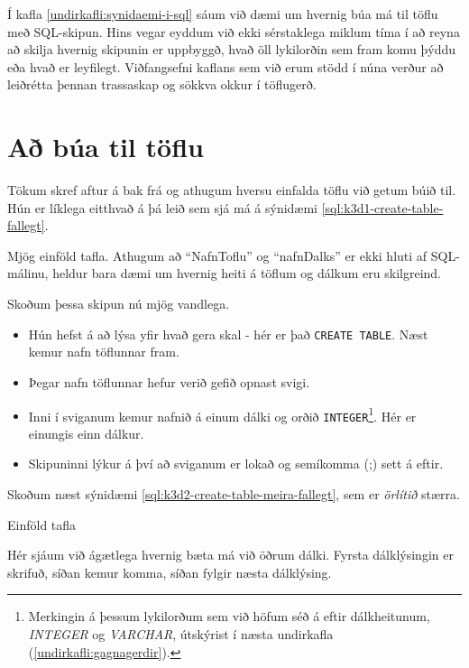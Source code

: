 Í kafla \ref{undirkafli:synidaemi-i-sql} sáum við dæmi um hvernig búa má til töflu með SQL-skipun. Hins vegar eyddum við ekki sérstaklega miklum tíma í að reyna að skilja hvernig skipunin er uppbyggð, hvað öll lykilorðin sem fram komu þýddu eða hvað er leyfilegt. Viðfangsefni kaflans sem við erum stödd í núna verður að leiðrétta þennan trassaskap og sökkva okkur í töflugerð.
\section{Að búa til töflu} %
Tökum skref aftur á bak frá og athugum hversu einfalda töflu við getum búið til. Hún er líklega eitthvað á þá leið sem sjá má á sýnidæmi \ref{sql:k3d1-create-table-fallegt}.

\begin{example}
\caption[Mjög einföld tafla]{Mjög einföld tafla. Athugum að ``NafnToflu'' og ``nafnDalks'' er ekki hluti af SQL-málinu, heldur bara dæmi um hvernig heiti á töflum og dálkum eru skilgreind.}
\label{sql:k3d1-create-table-fallegt}
\centering
{}
\end{example}

Skoðum þessa skipun nú mjög vandlega.
\begin{itemize}
 \item Hún hefst á að lýsa yfir hvað gera skal - hér er það \verb|CREATE TABLE|. Næst kemur nafn töflunnar fram.
 \item Þegar nafn töflunnar hefur verið gefið opnast svigi.
 \item Inni í sviganum kemur nafnið á einum dálki og orðið \verb|INTEGER|\footnote{Merkingin á þessum lykilorðum sem við höfum séð á eftir dálkheitunum, \emph{INTEGER} og \emph{VARCHAR}, útskýrist í næsta undirkafla (\ref{undirkafli:gagnagerdir}).}. Hér er einungis einn dálkur.
 \item Skipuninni lýkur á því að sviganum er lokað og semíkomma (;) sett á eftir.
\end{itemize}

Skoðum næst sýnidæmi \ref{sql:k3d2-create-table-meira-fallegt}, sem er \emph{örlítið} stærra.
\begin{example}
\caption{Einföld tafla}
\label{sql:k3d2-create-table-meira-fallegt}
\centering
{}
\end{example}

Hér sjáum við ágætlega hvernig bæta má við öðrum dálki. Fyrsta dálklýsingin er skrifuð, síðan kemur komma, síðan fylgir næsta dálklýsing.

